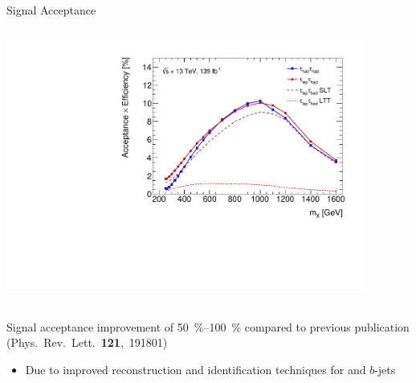 \documentclass[11pt, xcolor={dvipsnames}, aspectratio=169, notes]{beamer}
\begin{document}
\begin{frame}{Signal Acceptance}

  \vspace*{-1em}

  \begin{columns}[onlytextwidth, t]
    \centering


    \vspace{1.5em}


    \centering


    \includegraphics[width=0.88\textwidth, trim=0 0.5em 0 1em,
    clip]{selection/acceptance_resonant}
  \end{columns}

  \alert{Signal acceptance improvement of \SIrange{50}{100}{\percent}} compared
  to previous publication {\scriptsize (Phys.~Rev.~Lett.~\textbf{121},~191801)}
  \begin{itemize}

  \item Due to improved reconstruction and identification techniques for
    \tauhadvis and $b$-jets

  \end{itemize}
\end{frame}
\end{document}
